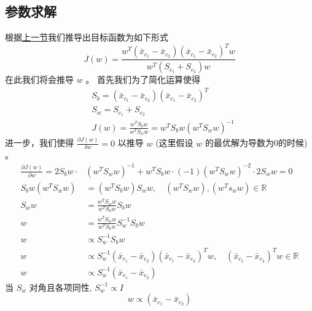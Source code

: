 \documentclass[11pt]{article}
\begin{document}
\subsection{参数求解}
\label{sec:org68e3a7c}
根据\hyperref[sec:orgc8a40ea]{上一节}我们推导出目标函数为如下形式 
\begin{equation}
J \left( w \right) = \frac{w^T \left( \bar{x}_{c_1} - \bar{x}_{c_2} \right)\left( \bar{x}_{c_1} - \bar{x}_{c_2} \right)^T w}{w^T \left( S_{c_1} + S_{c_2} \right) w}
\end{equation}
在此我们将会推导 \(w\) 。 
首先我们为了简化运算使得
\begin{equation}
\label{eq:13}
\begin{aligned}
&S_{b}=\left(\bar{x}_{c_1}-\bar{x}_{c_{2}}\right)\left(\bar{x}_{c_1}-\bar{x}_{c_2}\right)^{T}\\
&S_{w}=S_{c_1}+S_{c_{2}}\\
&J \left( w \right) = \frac{w^T S_b w}{w^T S_w w} = w^T S_b w (w^T S_w w)^{-1}
\end{aligned}
\end{equation}
进一步，我们使得 \(\frac{\partial J \left( w \right)}{\delta w} = 0\) 以推导 \(w\) (这里假设 \(w\) 的最优解为导数为0的时候) 。
\begin{equation}
\label{eq:16}
\begin{align}
\label{eq:18}
\frac{\partial J \left( w \right)}{\partial w} = 2 S_b w \cdot & \left( w^T S_w w \right)^{-1} + w^T S_b w \cdot \left( -1 \right) \left( w^T S_w w \right)^{-2} \cdot 2 S_w w  = 0\\
S_b w \left( w^T S_w w \right) &= \left ( w^T S_b w \right ) S_w w, \quad \left( w^T S_w w \right), \left( w^T s_w w \right) \in \mathbb{R}\\
S_w w &= \frac{w^T S_w w}{w^T S_b w} S_b w\\
    w &= \frac{w^T S_w w}{w^T S_b w} S_w^{-1} S_b w \\
    w &\propto S_w^{-1} S_b w\\
    w &\propto S_w^{-1} (\bar{x}_{c_1} - \bar{x}_{c_2}) (\bar{x}_{c_1} - \bar{x}_{c_2})^T w, \quad (\bar{x}_{c_1} - \bar{x}_{c_2})^T w \in \mathbb{R}\\
    w &\propto S_w^{-1} \left( \bar{x}_{c_1} - \bar{x}_{c_2} \right)
\end{align}
\end{equation}
当 \(S_w\) 对角且各项同性, \(S_w^{-1} \propto I\) 
\begin{equation}
\label{eq:19}
w  \propto \left( \bar{x}_{c_1} - \bar{x}_{c_2} \right)
\end{equation}
\end{document}
